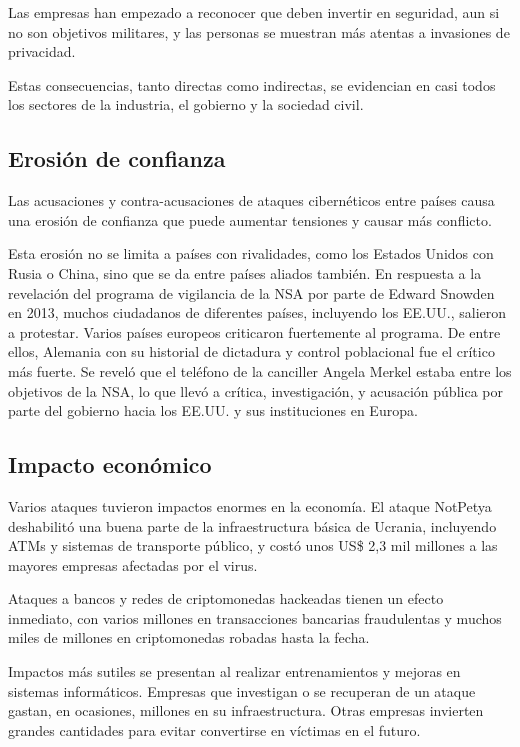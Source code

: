\documentclass{article}
\begin{document}
Las empresas han empezado a reconocer que deben invertir en seguridad, aun si no son objetivos militares, y las personas se muestran más atentas a invasiones de privacidad.

Estas consecuencias, tanto directas como indirectas, se evidencian en casi todos los sectores de la industria, el gobierno y la sociedad civil.

\subsection{Erosión de confianza}
Las acusaciones y contra-acusaciones de ataques cibernéticos entre países causa una erosión de confianza que puede aumentar tensiones y causar más conflicto.

Esta erosión no se limita a países con rivalidades, como los Estados Unidos con Rusia o China, sino que se da entre países aliados también. En respuesta a la revelación del programa de vigilancia de la NSA por parte de Edward Snowden en 2013, muchos ciudadanos de diferentes países, incluyendo los EE.UU., salieron a protestar. Varios países europeos criticaron fuertemente al programa. De entre ellos, Alemania con su historial de dictadura y control poblacional fue el crítico más fuerte. Se reveló que el teléfono de la canciller Angela Merkel estaba entre los objetivos de la NSA, lo que llevó a crítica, investigación, y acusación pública por parte del gobierno hacia los EE.UU. y sus instituciones en Europa. \autocite{wiki-reaction-snowden}

\subsection{Impacto económico}
Varios ataques tuvieron impactos enormes en la economía. El ataque NotPetya deshabilitó una buena parte de la infraestructura básica de Ucrania, incluyendo ATMs y sistemas de transporte público, y costó unos US\$ 2,3 mil millones a las mayores empresas afectadas por el virus. \autocite{wired-notpetya}

Ataques a bancos y redes de criptomonedas hackeadas tienen un efecto inmediato, con varios millones en transacciones bancarias fraudulentas y muchos miles de millones en criptomonedas robadas hasta la fecha. \autocite{wired-bangladesh} \autocite{chainsec-axie}

Impactos más sutiles se presentan al realizar entrenamientos y mejoras en sistemas informáticos. Empresas que investigan o se recuperan de un ataque gastan, en ocasiones, millones en su infraestructura. Otras empresas invierten grandes cantidades para evitar convertirse en víctimas en el futuro. \autocite{wiki-reaction-snowden}
\end{document}
